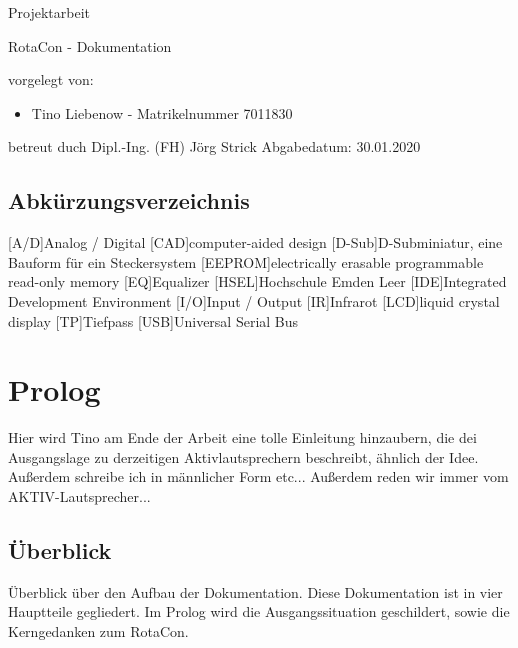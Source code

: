 \documentclass[11pt, titlepage]{report}
\author{Liebenow,Tino}
\date{\textit{<2020-01-26 Sun>}}
\begin{document}
\begin{titlepage}
	\hsellogo\hfill Projektarbeit
	\par
	\vspace{4cm}
	\noindent\parbox{0.8\textwidth}{\Huge RotaCon - Dokumentation}  
	\vspace{2cm}


	\Large \noindent vorgelegt von:
	\begin{itemize}
		\item Tino Liebenow - Matrikelnummer 7011830
	\end{itemize}
	\vspace{2cm}
	betreut duch\newline
	Dipl.-Ing. (FH) Jörg Strick\newline
	Abgabedatum: 30.01.2020
\end{titlepage}
	\newpage
	\tableofcontents
	\newpage
	\begingroup
		\renewcommand\clearpage{\relax}
		\listoffigures
		\listoftables
	\endgroup
	\newpage
    \section*{\Huge Abkürzungsverzeichnis}%
    \label{sec:Abkürzungsverzeichnis}
    \vspace{1cm}
	\begin{acronym}
		[A/D]{Analog / Digital}
		[CAD]{computer-aided design}
		[D-Sub]{D-Subminiatur, eine Bauform für ein Steckersystem}
		[EEPROM]{electrically erasable programmable read-only memory}
		[EQ]{Equalizer}
		{Hochschule Emden Leer}
		[IDE]{Integrated Development Environment}
		[I/O]{Input / Output}
		[IR]{Infrarot}
		[LCD]{liquid crystal display}
		[TP]{Tiefpass}
		[USB]{Universal Serial Bus}
    \end{acronym}
	\newpage
	\chapter{Prolog}
		Hier wird Tino am Ende der Arbeit eine tolle Einleitung hinzaubern, die dei Ausgangslage zu derzeitigen Aktivlautsprechern beschreibt, ähnlich der Idee. Außerdem schreibe ich in männlicher Form etc...\newline
		Außerdem reden wir immer vom AKTIV-Lautsprecher...
	\section*{Überblick}
		Überblick über den Aufbau der Dokumentation.\newline
		Diese Dokumentation ist in vier Hauptteile gegliedert. Im Prolog wird die Ausgangssituation geschildert, sowie die Kerngedanken zum RotaCon.
\end{document}
